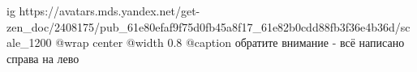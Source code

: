  
 
 
 
 

\ifcmt
  ig https://avatars.mds.yandex.net/get-zen_doc/2408175/pub_61e80efaf9f75d0fb45a8f17_61e82b0cdd88fb3f36e4b36d/scale_1200
  @wrap center
  @width 0.8
  @caption обратите внимание - всё написано справа на лево
\fi
